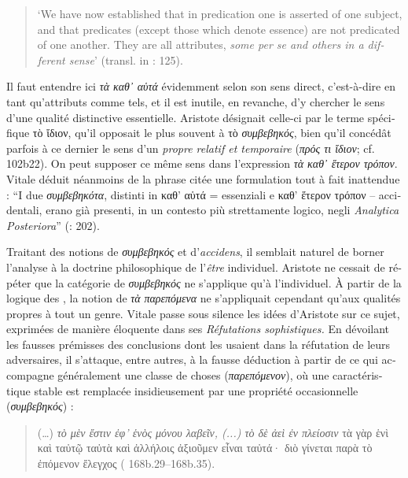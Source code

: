 \documentclass[output=paper]{langsci/langscibook}
\begin{document}
\begin{otherlanguage}{french}
\begin{quote}
    `We have now established that in predication one is asserted of one subject, and that predicates (except those which denote essence) are not predicated of one another. They are all attributes, \textit{some per se and others in a different sense}' (transl. in : 125).
\end{quote}

Il faut entendre ici \textit{τὰ καθ᾿ αὑτά} évidemment selon son sens direct, c’est-à-dire en tant qu’attributs comme tels, et il est inutile, en revanche, d’y chercher le sens d’une qualité distinctive essentielle. Aristote désignait celle-ci par le terme spécifique τὸ ἴδιον, qu’il opposait le plus souvent à τὸ \textit{συμβεβηκός}, bien qu’il concédât parfois à ce dernier le sens d’un \textit{propre relatif et temporaire} (\textit{πρός τι ἴδιον}; cf.  102b22). On peut supposer ce même sens dans l’expression \textit{τὰ καθ᾿ ἕτερον τρόπον}. Vitale déduit néanmoins de la phrase citée une formulation tout à fait inattendue : “I due \textit{συμβεβηκότα}, distinti in καθ’ αὑτά  = essenziali e καθ’ ἕτερον τρόπον – accidentali, erano già presenti, in un contesto più strettamente logico, negli \textit{Analytica Posteriora}” (\citealt{vitale_per_1982}: 202).

Traitant des notions de \textit{συμβεβηκός} et d’\textit{accidens}, il semblait naturel de borner l’analyse à la doctrine philosophique de l’\textit{être} individuel. Aristote ne cessait de répéter que la catégorie de \textit{συμβεβηκός} ne s’applique qu’à l’individuel. À partir de la logique des , la notion de \textit{τὰ} \textit{παρεπόμενα} ne s’appliquait cependant qu’aux qualités propres à tout un genre. Vitale passe sous silence les idées d’Aristote sur ce sujet, exprimées de manière éloquente dans ses \textit{Réfutations sophistiques.} En dévoilant les fausses prémisses des conclusions dont les  usaient dans la réfutation de leurs adversaires, il s’attaque, entre autres, à la fausse déduction à partir de ce qui accompagne généralement une classe de choses (\textit{παρεπόμενον}), où une caractéristique stable est remplacée insidieusement par une propriété occasionnelle (\textit{συμβεβηκός}) :

\begin{quote}
    
(…) \textit{τὸ μὲν  ἔστιν ἐφ’ ἑνὸς μόνου λαβεῖν, (...) τὸ δὲ  ἀεὶ ἐν πλείοσιν} τὰ γὰρ ἑνὶ καὶ ταὐτῷ ταὐτὰ καὶ ἀλλήλοις ἀξιοῦμεν εἶναι ταὐτά· διὸ γίνεται παρὰ τὸ ἐπόμενον ἔλεγχος ( 168b.29--168b.35).


\end{quote}
\end{otherlanguage}
\end{document}
